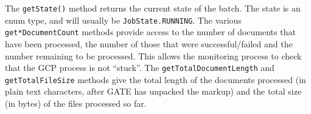 The \verb!getState()! method returns the current state of the batch.  The state
is an enum type, and will usually be \verb!JobState.RUNNING!.  The various
\verb!get*DocumentCount! methods provide access to the number of documents that
have been processed, the number of those that were successful/failed and the
number remaining to be processed.  This allows the monitoring process to check
that the GCP process is not ``stuck''.  The \verb!getTotalDocumentLength! and
\verb!getTotalFileSize! methods give the total length of the documents
processed (in plain text characters, after GATE has unpacked the markup) and
the total size (in bytes) of the files processed so far.


